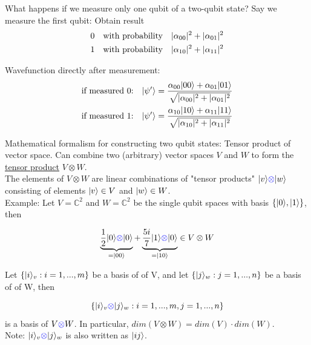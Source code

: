 What happens if we measure only one qubit of a two-qubit state?
Say we measure the first qubit: Obtain result
\begin{align*}
    0 &\quad \text{with probability} \quad \lvert\alpha_{00}\rvert^2 + \lvert\alpha_{01}\rvert^2 \\ 
    1 &\quad \text{with probability} \quad \lvert\alpha_{10}\rvert^2 + \lvert\alpha_{11}\rvert^2
\end{align*}

Wavefunction directly after measurement:
\begin{align*}
    &\text{if measured 0:} \quad \lvert\psi'\rangle 
        = \frac{\alpha_{00}\lvert00\rangle + \alpha_{01}\lvert01\rangle}{\sqrt{\lvert\alpha_{00}\rvert^2 + \lvert\alpha_{01}\rvert^2}} \\
    &\text{if measured 1:} \quad \lvert\psi'\rangle 
        = \frac{\alpha_{10}\lvert10\rangle + \alpha_{11}\lvert11\rangle}{\sqrt{\lvert\alpha_{10}\rvert^2 + \lvert\alpha_{11}\rvert^2}} \\
\end{align*}


Mathematical formalism for constructing two qubit states: Tensor product of vector space. \newline
Can combine two (arbitrary) vector spaces $V$ and $W$ to form the \underline{tensor product}
$V \otimes W$. \\
The elements of $V \otimes W$ are linear combinations of "tensor products" 
$\lvert v\rangle {\color{blue} \otimes} \lvert w\rangle$ consisting of elements $\lvert v\rangle \in V$ and  $\lvert w\rangle \in W$. \\

Example: Let $V = \mathbb{C}^2$ and $W = \mathbb{C}^2$ be the single qubit spaces with basis
$\{\lvert0\rangle, \lvert1\rangle\}$, then

\begin{equation*}
    \underbrace{\frac{1}{2} \lvert0\rangle {\color{blue} \otimes} \lvert0\rangle}_{=\lvert00\rangle} + 
    \underbrace{\frac{5i}{7} \lvert1\rangle {\color{blue} \otimes} \lvert0\rangle}_{=\lvert10\rangle} 
    \in V \otimes W
\end{equation*}

Let $\{\lvert i\rangle_v : i = 1, ... ,m\}$ be a basis of of V, and 
let $\{\lvert j\rangle_w : j = 1, ... ,n\}$ be a basis of of W, then

\begin{equation*}
    \{\lvert i\rangle_v {\color{blue}\otimes} \lvert j\rangle_w : i = 1,...,m, j = 1,...,n \}    
\end{equation*}
is a basis of $V {\color{blue} \otimes} W$.
In particular, $dim(V \otimes W) = dim(V) \cdot dim(W)$.\\ 
Note: $\lvert i\rangle_v {\color{blue}\otimes} \lvert j\rangle_w$ is also written as $\lvert ij\rangle$. \\

